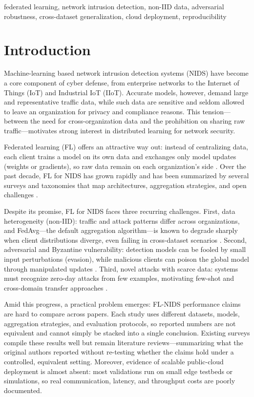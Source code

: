 \documentclass[conference]{IEEEtran}
\begin{document}
\begin{IEEEkeywords}
federated learning, network intrusion detection, non-IID data, adversarial
robustness, cross-dataset generalization, cloud deployment, reproducibility
\end{IEEEkeywords}

\section{Introduction}
Machine-learning based network intrusion detection systems (NIDS) have become a core
component of cyber defense, from enterprise networks to the Internet of Things (IoT)
and Industrial IoT (IIoT). Accurate models, however, demand large and representative traffic
data, while such data are sensitive and seldom allowed to leave an organization for
privacy and compliance reasons. This tension---between the need for cross-organization
data and the prohibition on sharing raw traffic---motivates strong interest in
distributed learning for network security.

Federated learning (FL) offers an attractive way out: instead of centralizing data,
each client trains a model on its own data and exchanges only model updates (weights
or gradients), so raw data remain on each organization's side \cite{b1}. Over the past
decade, FL for NIDS has grown rapidly and has been summarized by several surveys and
taxonomies that map architectures, aggregation strategies, and open challenges
\cite{b1,b2,b3,b4}.

Despite its promise, FL for NIDS faces three recurring challenges. First, data
heterogeneity (non-IID): traffic and attack patterns differ across organizations, and
FedAvg---the default aggregation algorithm---is known to degrade sharply when
client distributions diverge, even failing in cross-dataset scenarios \cite{b4,b5}.
Second, adversarial and Byzantine vulnerability: detection models can be fooled by
small input perturbations (evasion), while malicious clients can poison the global
model through manipulated updates \cite{b6,b7,b8}. Third, novel attacks with scarce
data: systems must recognize zero-day attacks from few examples, motivating few-shot
and cross-domain transfer approaches \cite{b9,b10}.

Amid this progress, a practical problem emerges: FL-NIDS performance claims are hard
to compare across papers. Each study uses different datasets, models, aggregation
strategies, and evaluation protocols, so reported numbers are not equivalent and
cannot simply be stacked into a single conclusion. Existing surveys compile these
results well but remain literature reviews---summarizing what the original authors
reported without re-testing whether the claims hold under a controlled, equivalent
setting. Moreover, evidence of scalable public-cloud deployment is almost absent:
most validations run on small edge testbeds or simulations, so real communication,
latency, and throughput costs are poorly documented.
\end{document}
